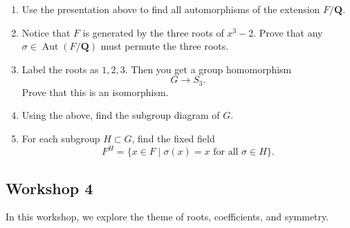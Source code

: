 \documentclass[11pt]{article}
\begin{document}
\begin{enumerate}
\item Use the presentation above to find all automorphisms of the extension \(F/\mathbf{Q}\).

\item Notice that \(F\) is generated by the three roots of \(x^3-2\).
Prove that any \(\sigma \in \operatorname{Aut}(F/\mathbf{Q})\) must permute the three roots.

\item Label the roots as \(1, 2, 3\).
Then you get a group homomorphism
\[ G  \to S_3.\]
Prove that this is an isomorphism.

\item Using the above, find the subgroup diagram of \(G\).

\item For each subgroup \(H \subset G\), find the fixed field
\[ F^H = \{x \in F \mid \sigma (x) = x \text{ for all } \sigma \in H\}.\]
\end{enumerate}
\subsection{Workshop 4}
\label{sec:orgcdc8eeb}
In this workshop, we explore the theme of roots, coefficients, and symmetry.
\end{document}
